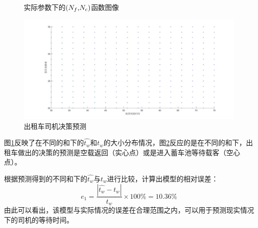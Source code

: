 \documentclass{cumcm}
\begin{document}
\begin{enumerate}[(1)]
\begin{figure}[H]
		\caption{实际参数下的\waittime$(\mbox{$N_f$,$N_c$})$函数图像}
		\label{fi:problem2func}
	\end{figure}
	\begin{figure}[H]   
		\centering   
		\includegraphics[width=1.0\textwidth]{img/problem2_pred.jpg}   
		\caption{出租车司机决策预测}   
		\label{fi:problem2pred}    
	\end{figure}
	图\ref{fi:problem2func}反映了在不同的\flightnum 和\taxinum 下的$\hat{t_w}$和$t_w$的大小分布情况，图\ref{fi:problem2pred}反应的是在不同的\flightnum 和\taxinum 下，出租车做出的决策的预测是空载返回（实心点）或是进入蓄车池等待载客（空心点）。\par
	根据预测得到的不同\flightnum 和\taxinum 下的$\hat{t_w}$与$t_w$进行比较，计算出模型的相对误差：
	\begin{equation}
		e_1=\frac{\left| \hat{t_w}-t_w\right| }{t_w}\times100\%=10.36\%
	\end{equation}
	由此可以看出，该模型与实际情况的误差在合理范围之内，可以用于预测现实情况下的司机的等待时间。	
\end{enumerate}
\end{document}

